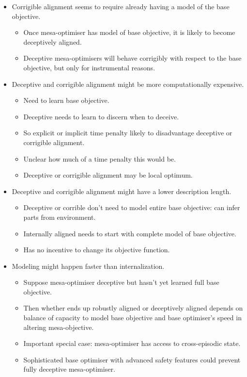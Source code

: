 \begin{itemize}
    \item Corrigible alignment seems to require already having a model of the base objective.
    \begin{itemize}
        \item Once mesa-optimiser has model of base objective, it is likely to become deceptively aligned.
        \item Deceptive mesa-optimisers will behave corrigibly with respect to the base objective, but only for instrumental reasons.
    \end{itemize}
    \item Deceptive and corrigible alignment might be more computationally expensive.
    \begin{itemize}
        \item Need to learn base objective.
        \item Deceptive needs to learn to discern when to deceive.
        \item So explicit or implicit time penalty likely to disadvantage deceptive or corrigible alignment. 
        \item Unclear how much of a time penalty this would be.
        \item Deceptive or corrigible alignment may be local optimum.
    \end{itemize}
    \item Deceptive and corrigible alignment might have a lower description length.
    \begin{itemize}
        \item Deceptive or corrible don't need to model entire base objective: can infer parts from environment.
        \item Internally aligned needs to start with complete model of base objective.
        \item Has no incentive to change its objective function.
    \end{itemize}
    \item Modeling might happen faster than internalization.
    \begin{itemize}
        \item Suppose mesa-optimiser deceptive but hasn't yet learned full base objective.
        \item Then whether ends up robustly aligned or deceptively aligned depends on balance of capacity to model base objective and base optimiser's speed in altering mesa-objective.
        \item Important special case: mesa-optimiser has access to cross-episodic state.
        \item Sophisticated base optimiser with advanced safety features could prevent fully deceptive mesa-optimiser.
    \end{itemize}
\end{itemize}


